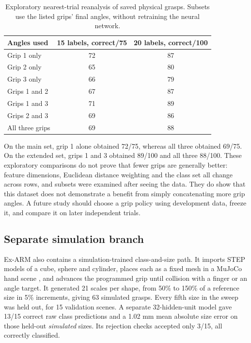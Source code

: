 \documentclass[12pt,a4paper]{article}
\begin{document}
\begin{table}[ht]
\centering
\caption{Exploratory nearest-trial reanalysis of saved physical grasps. Subsets use the listed grips' final angles, without retraining the neural network.}
\label{tab:grips}
\begin{tabular}{lcc}
\toprule
Angles used & 15 labels, correct/75 & 20 labels, correct/100 \\
\midrule
Grip 1 only & 72 & 87 \\
Grip 2 only & 65 & 80 \\
Grip 3 only & 66 & 79 \\
Grips 1 and 2 & 67 & 87 \\
Grips 1 and 3 & 71 & 89 \\
Grips 2 and 3 & 69 & 86 \\
All three grips & 69 & 88 \\
\bottomrule
\end{tabular}
\end{table}

On the main set, grip 1 alone obtained 72/75, whereas all three obtained 69/75. On the extended set, grips 1 and 3 obtained 89/100 and all three 88/100. These exploratory comparisons do not prove that fewer grips are generally better: feature dimensions, Euclidean distance weighting and the class set all change across rows, and subsets were examined after seeing the data. They do show that this dataset does not demonstrate a benefit from simply concatenating more grip angles. A future study should choose a grip policy using development data, freeze it, and compare it on later independent trials.

\subsection{Separate simulation branch}

Ex-ARM also contains a simulation-trained class-and-size path. It imports STEP models of a cube, sphere and cylinder, places each as a fixed mesh in a MuJoCo hand scene \cite{todorov2012}, and advances the programmed grip until collision with a finger or an angle target. It generated 21 scales per shape, from 50\% to 150\% of a reference size in 5\% increments, giving 63 simulated grasps. Every fifth size in the sweep was held out, for 15 validation scenes. A separate 32-hidden-unit model gave 13/15 correct raw class predictions and a 1.02 mm mean absolute size error on those held-out \emph{simulated} sizes. Its rejection checks accepted only 3/15, all correctly classified.
\end{document}
